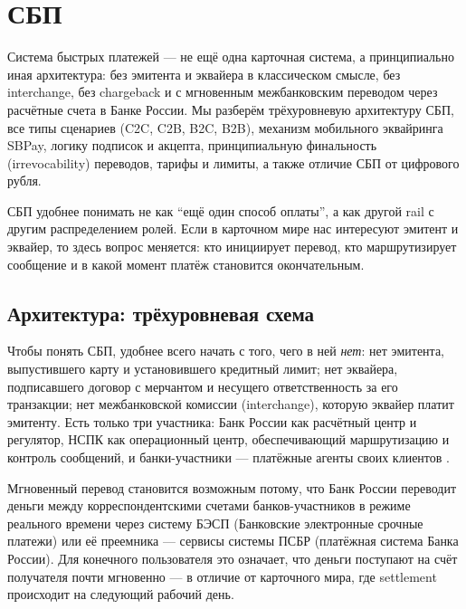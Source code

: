 \chapter{СБП}
\label{ch:sbp}
\margintoc


\begin{kaobox}[title=Что вы узнаете из этой главы]
  Система быстрых платежей — не ещё одна карточная система, а принципиально
  иная архитектура: без эмитента и эквайера в классическом смысле,
  без interchange, без chargeback и с мгновенным межбанковским переводом
  через расчётные счета в Банке России. Мы разберём трёхуровневую
  архитектуру СБП, все типы сценариев (C2C, C2B, B2C, B2B), механизм
  мобильного эквайринга SBPay, логику подписок и акцепта, принципиальную
  финальность (irrevocability) переводов, тарифы и лимиты, а также
  отличие СБП от цифрового рубля.
\end{kaobox}

СБП удобнее понимать не как \enquote{ещё один способ оплаты},
а как другой rail с другим распределением ролей. Если в карточном
мире нас интересуют эмитент и эквайер, то здесь вопрос меняется:
кто инициирует перевод, кто маршрутизирует сообщение и в какой
момент платёж становится окончательным.

\section{Архитектура: трёхуровневая схема}
\label{sec:sbp-architecture}

Чтобы понять СБП, удобнее всего начать с того, чего в ней \emph{нет}:
нет эмитента, выпустившего карту и установившего кредитный лимит;
нет эквайера, подписавшего договор с мерчантом и несущего ответственность
за его транзакции; нет межбанковской комиссии (interchange), которую
эквайер платит эмитенту. Есть только три участника: Банк России
как расчётный центр и регулятор, НСПК как операционный центр,
обеспечивающий маршрутизацию и контроль сообщений, и банки-участники —
платёжные агенты своих клиентов .

Мгновенный перевод становится возможным потому, что Банк России
переводит деньги между корреспондентскими счетами банков-участников
в режиме реального времени через систему БЭСП (Банковские электронные
срочные платежи) или её преемника — сервисы системы ПСБР (платёжная
система Банка России). Для конечного пользователя это означает, что деньги
поступают на счёт получателя почти мгновенно — в отличие от карточного
мира, где settlement происходит на следующий рабочий день.

